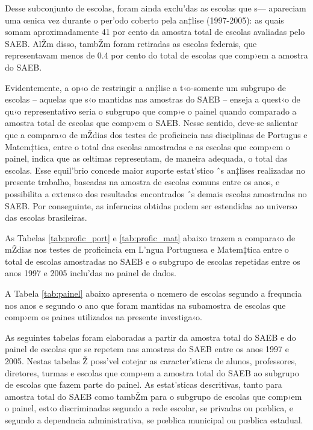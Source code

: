 \documentclass[a4paper, 12pt]{article}
\begin{document}
Desse subconjunto de escolas, foram ainda exclu’das as escolas que s— apareciam uma œnica vez durante o per’odo coberto pela an‡lise (1997-2005): as quais somam aproximadamente 41 por cento da amostra total de escolas avaliadas pelo SAEB. AlŽm disso, tambŽm foram retiradas as escolas federais, que representavam menos de 0.4 por cento do total de escolas que comp›em a amostra do SAEB.   

Evidentemente, a op‹o de restringir a an‡lise a t‹o-somente um subgrupo de escolas -- aquelas que s‹o mantidas nas amostras do SAEB -- enseja a quest‹o de qu‹o representativo seria o subgrupo que comp›e o painel quando comparado a amostra total de escolas que comp›em o SAEB. Nesse sentido, deve-se salientar que a compara‹o de mŽdias dos testes de proficincia nas disciplinas de Portugus e Matem‡tica, entre o total das escolas amostradas e as escolas que comp›em o painel, indica que as œltimas representam, de maneira adequada, o total das escolas. Esse equil’brio concede maior suporte estat’stico ˆs an‡lises realizadas no presente trabalho, baseadas na amostra de escolas comuns entre os anos, e possibilita a extens‹o dos resultados encontrados ˆs demais escolas amostradas no SAEB. Por conseguinte, as inferncias obtidas podem ser estendidas ao universo das escolas brasileiras.

\vspace*{1cm} 



As Tabelas \ref{tab:profic_port} e \ref{tab:profic_mat} abaixo trazem a compara‹o de mŽdias nos testes de proficincia em L’ngua Portuguesa e Matem‡tica entre o total de escolas amostradas no SAEB e o subgrupo de escolas repetidas entre os anos 1997 e 2005 inclu’das no painel de dados.

A Tabela \ref{tab:painel} abaixo apresenta o nœmero de escolas segundo a frequncia nos anos e segundo o ano que foram mantidas na subamostra de escolas que comp›em os paines utilizados na presente investiga‹o.

\vspace*{1cm} 


As seguintes tabelas foram elaboradas a partir da amostra total do SAEB e do painel de escolas que se repetem nas amostras do SAEB entre os anos 1997 e 2005. Nestas tabelas Ž poss’vel cotejar as caracter’sticas de alunos, professores, diretores, turmas e escolas que comp›em a amostra total do SAEB ao subgrupo de escolas que fazem parte do painel. As estat’sticas descritivas, tanto para amostra total do SAEB como tambŽm para o subgrupo de escolas que comp›em o painel, est‹o discriminadas segundo a rede escolar, se privadas ou pœblica, e segundo a dependncia administrativa, se pœblica municipal ou pœblica estadual. 
\end{document}
